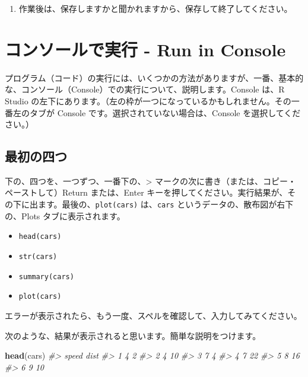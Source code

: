 \documentclass[
  xelatex, ja=standard]{bxjsbook}
\newenvironment{Shaded}{\begin{snugshade}}{\end{snugshade}}
\newcommand{\CommentTok}[1]{\textcolor[rgb]{0.56,0.35,0.01}{\textit{#1}}}
\newcommand{\FunctionTok}[1]{\textcolor[rgb]{0.13,0.29,0.53}{\textbf{#1}}}
\newcommand{\NormalTok}[1]{#1}
\providecommand{\tightlist}{%
  \setlength{\itemsep}{0pt}\setlength{\parskip}{0pt}}
\theoremstyle{definition}
\theoremstyle{definition}
\theoremstyle{definition}
\theoremstyle{definition}
\theoremstyle{remark}
\begin{document}
\begin{enumerate}
\def\labelenumi{\arabic{enumi}.}
\setcounter{enumi}{4}
\tightlist
\item
  作業後は、保存しますかと聞かれますから、保存して終了してください。
\end{enumerate}

\hypertarget{ux30b3ux30f3ux30bdux30fcux30ebux3067ux5b9fux884c---run-in-console}{%
\section{コンソールで実行 - Run in Console}\label{ux30b3ux30f3ux30bdux30fcux30ebux3067ux5b9fux884c---run-in-console}}

プログラム（コード）の実行には、いくつかの方法がありますが、一番、基本的な、コンソール（Console）での実行について、説明します。Console は、R Studio の左下にあります。（左の枠が一つになっているかもしれません。その一番左のタブが Console です。選択されていない場合は、Console を選択してください。）

\hypertarget{ux6700ux521dux306eux56dbux3064}{%
\subsection{最初の四つ}\label{ux6700ux521dux306eux56dbux3064}}

下の、四つを、一つずつ、一番下の、\textgreater{} マークの次に書き（または、コピー・ペーストして）Return または、Enter キーを押してください。実行結果が、その下に出ます。最後の、\texttt{plot(cars)} は、\texttt{cars} というデータの、散布図が右下の、Plots タブに表示されます。

\begin{itemize}
\tightlist
\item
  \texttt{head(cars)}
\item
  \texttt{str(cars)}
\item
  \texttt{summary(cars)}
\item
  \texttt{plot(cars)}
\end{itemize}

エラーが表示されたら、もう一度、スペルを確認して、入力してみてください。

次のような、結果が表示されると思います。簡単な説明をつけます。

\begin{Shaded}
\begin{Highlighting}[]
\FunctionTok{head}\NormalTok{(cars)}
\CommentTok{\#\textgreater{}   speed dist}
\CommentTok{\#\textgreater{} 1     4    2}
\CommentTok{\#\textgreater{} 2     4   10}
\CommentTok{\#\textgreater{} 3     7    4}
\CommentTok{\#\textgreater{} 4     7   22}
\CommentTok{\#\textgreater{} 5     8   16}
\CommentTok{\#\textgreater{} 6     9   10}
\end{Highlighting}
\end{Shaded}
\end{document}

